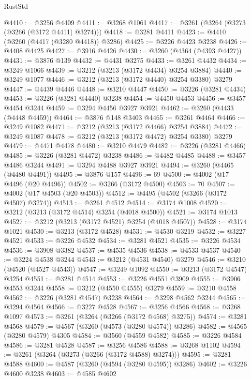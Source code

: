 \begin{lexlean}{RustStd}
\begin{coremodule}
{\begin{coremodule}
{{{{{{{{{{{{{{{{{{{{{{{{{{@4410 := @3256 @4409
@4411 := @3268 @1061
@4417 := @3261 (@3264 (@3273 (@3266 (@3172 @4411) @3274)))
@4418 := @3281 @4411
@4423 := @4410 (@3260 (@4417 (@3280 @4418)) @3286)
@4425 := @3226 @4423 @3238
@4426 := @4408 @4425
@4427 := @3916 @4426
@4430 := @3260 (@4364 (@4393 @4427))
@4431 := @3876 @139
@4432 := @4431 @3275
@4433 := @3261 @4432
@4434 := @3249 @1066
@4439 := @3212 (@3213 (@3172 @4434) @3254 @3884)
@4440 := @3249 @1077
@4446 := @3212 (@3213 (@3172 @4440) @3254 @3380) @3279
@4447 := @4439 @4446
@4448 := @3210 @4447
@4450 := @3226 (@3281 @4434)
@4453 := @3226 (@3281 @4440) @3238
@4454 := @4450 @4453
@4456 := @3457 @4454 @3244
@4459 := @3294 @4456 @3927 @3921
@4462 := @3260 (@4433 (@4448 @4459))
@4464 := @3876 @148 @3403
@4465 := @3261 @4464
@4466 := @3249 @1082
@4471 := @3212 (@3213 (@3172 @4466) @3254 @3884)
@4472 := @3249 @1087
@4478 := @3212 (@3213 (@3172 @4472) @3254 @3380) @3279
@4479 := @4471 @4478
@4480 := @3210 @4479
@4482 := @3226 (@3281 @4466)
@4485 := @3226 (@3281 @4472) @3238
@4486 := @4482 @4485
@4488 := @3457 @4486 @3244
@4491 := @3294 @4488 @3927 @3921
@4494 := @3260 (@4465 (@4480 @4491))
@4495 := @3876 @157
@4496 := 69
@4500 := @4002 (@17 @4496 (@20 @4496))
@4502 := @3266 (@3172 @4500)
@4503 := 70
@4507 := @4002 (@17 @4503 (@20 @4503))
@4512 := @4495 (@4502 (@3266 (@3172 @4507) @3274))
@4513 := @3261 @4512
@4514 := @3174 @1008
@4520 := @3212 (@3213 (@3172 @4514) @3254 (@4018 @4500))
@4521 := @3174 @1013
@4527 := @3212 (@3213 (@3172 @4521) @3254 (@4018 @4507))
@4528 := @3174 @1021
@4530 := @3213 (@3172 @4528)
@4531 := @4530 @3219
@4532 := @3227 @4521
@4533 := @3226 @4532
@4534 := @3281 @4521
@4535 := @3226 @4534
@4536 := @3908 @3382
@4537 := @4535 @4536
@4538 := @4533 @4537
@4540 := @3224 @4538 @3244
@4543 := @3212 (@4531 @4540) @3279
@4546 := @3210 (@4520 (@4527 @4543))
@4547 := @3249 @1092
@4550 := @3213 (@3172 @4547) @3254
@4551 := @3281 @4514
@4553 := @3226 @4551 @3909
@4555 := @3906 @4553 @3244
@4558 := @3212 (@4550 @4555) @3279
@4559 := @3210 @4558
@4562 := @3226 (@3281 @4547) @3238
@4564 := @3298 @4562 @3244
@4565 := @3294 @4564
@4566 := @3227 @4528
@4567 := @3256 @4566
@4568 := @3268 @1097
@4573 := @3261 (@3264 (@3266 (@3172 @4568) @3275))
@4574 := @3281 @4568
@4579 := @4567 (@3260 (@4573 (@3280 @4574)) @3286)
@4582 := @4565 (@3280 @4579) @4305
@4584 := @3560 (@4559 @4582)
@4585 := @3226 @4584
@4586 := @3281 @4528
@4587 := @3256 @4586
@4588 := @3268 @1102
@4594 := @3261 (@3264 (@3273 (@3266 (@3172 @4588) @3274)))
@4595 := @3281 @4588
@4600 := @4587 (@3260 (@4594 (@3280 @4595)) @3286)
@4602 := @3226 @4600 @3238
@4603 := @4585 @4602
}}}}}}}}}}}}}}}}}}}}}}}}}}
\end{coremodule}}
\end{coremodule}
\end{lexlean}
